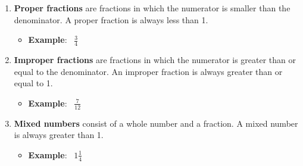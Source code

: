 \documentclass[handout, font=12pt]{ximera}
\begin{document}
\begin{problem}
\begin{center}
\begin{tikzpicture}[thick, scale=0.5]
\end{tikzpicture} 


\end{center}

\end{problem}

\begin{definition}

\begin{enumerate}
\item \textbf{Proper fractions} are fractions in which the numerator is smaller
than the denominator.  A proper fraction is always less than 1.

\begin{itemize}
        \item \textcolor{accessibleOrange}{\textbf{Example}}: \ $\frac{3}{4}$
\end{itemize}


\item \textbf{Improper fractions} are fractions in which the numerator is greater than
or equal to the denominator.  An improper fraction is always greater than or equal to 1.

\begin{itemize}
        \item \textcolor{accessibleOrange}{\textbf{Example}}: \ $\frac{7}{12}$
\end{itemize}


\item \textbf{Mixed numbers} consist of a whole number and a fraction.  A mixed number
is always greater than 1.

\begin{itemize}
        \item \textcolor{accessibleOrange}{\textbf{Example}}: \ $1 \frac{1}{4}$
\end{itemize}

\end{enumerate}

\end{definition}
\end{document}

